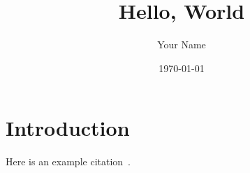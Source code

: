 \documentclass{article}
\title{Hello, World}
\author{Your Name}
\date{\today{}}
\begin{document}
\maketitle

\section{Introduction}

Here is an example citation~\cite{knuth1997art}.



\end{document}
